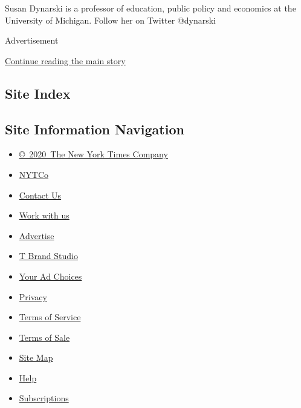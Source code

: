 Susan Dynarski is a professor of education, public policy and economics
at the University of Michigan. Follow her on Twitter @dynarski

Advertisement

\protect\hyperlink{after-bottom}{Continue reading the main story}

\hypertarget{site-index}{%
\subsection{Site Index}\label{site-index}}

\hypertarget{site-information-navigation}{%
\subsection{Site Information
Navigation}\label{site-information-navigation}}

\begin{itemize}
\tightlist
\item
  \href{https://help.nytimes3xbfgragh.onion/hc/en-us/articles/115014792127-Copyright-notice}{©~2020~The
  New York Times Company}
\end{itemize}

\begin{itemize}
\tightlist
\item
  \href{https://www.nytco.com/}{NYTCo}
\item
  \href{https://help.nytimes3xbfgragh.onion/hc/en-us/articles/115015385887-Contact-Us}{Contact
  Us}
\item
  \href{https://www.nytco.com/careers/}{Work with us}
\item
  \href{https://nytmediakit.com/}{Advertise}
\item
  \href{http://www.tbrandstudio.com/}{T Brand Studio}
\item
  \href{https://www.nytimes3xbfgragh.onion/privacy/cookie-policy\#how-do-i-manage-trackers}{Your
  Ad Choices}
\item
  \href{https://www.nytimes3xbfgragh.onion/privacy}{Privacy}
\item
  \href{https://help.nytimes3xbfgragh.onion/hc/en-us/articles/115014893428-Terms-of-service}{Terms
  of Service}
\item
  \href{https://help.nytimes3xbfgragh.onion/hc/en-us/articles/115014893968-Terms-of-sale}{Terms
  of Sale}
\item
  \href{https://spiderbites.nytimes3xbfgragh.onion}{Site Map}
\item
  \href{https://help.nytimes3xbfgragh.onion/hc/en-us}{Help}
\item
  \href{https://www.nytimes3xbfgragh.onion/subscription?campaignId=37WXW}{Subscriptions}
\end{itemize}
